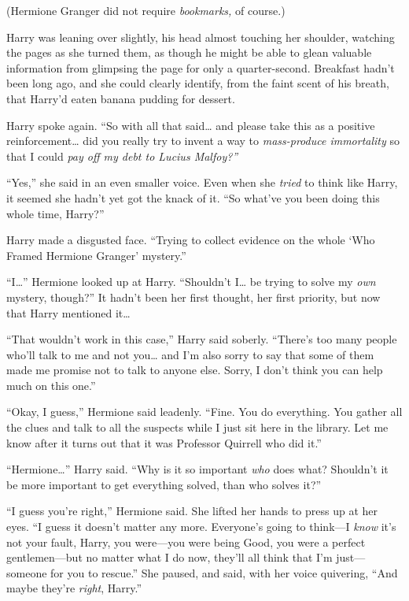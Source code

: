 (Hermione Granger did not require \emph{bookmarks,} of course.)

Harry was leaning over slightly, his head almost touching her shoulder,
watching the pages as she turned them, as though he might be able to
glean valuable information from glimpsing the page for only a
quarter-second. Breakfast hadn't been long ago, and she could clearly
identify, from the faint scent of his breath, that Harry'd eaten banana
pudding for dessert.

Harry spoke again. ``So with all that said\ldots{} and please take this
as a positive reinforcement\ldots{} did you really try to invent a way
to \emph{mass-produce immortality} so that I could \emph{pay off my debt
to Lucius Malfoy?''}

``Yes,'' she said in an even smaller voice. Even when she \emph{tried}
to think like Harry, it seemed she hadn't yet got the knack of it. ``So
what've you been doing this whole time, Harry?''

Harry made a disgusted face. ``Trying to collect evidence on the whole
`Who Framed Hermione Granger' mystery.''

``I\ldots{}'' Hermione looked up at Harry. ``Shouldn't I\ldots{} be
trying to solve my \emph{own} mystery, though?'' It hadn't been her
first thought, her first priority, but now that Harry mentioned
it\ldots{}

``That wouldn't work in this case,'' Harry said soberly. ``There's too
many people who'll talk to me and not you\ldots{} and I'm also sorry to
say that some of them made me promise not to talk to anyone else. Sorry,
I don't think you can help much on this one.''

``Okay, I guess,'' Hermione said leadenly. ``Fine. You do everything.
You gather all the clues and talk to all the suspects while I just sit
here in the library. Let me know after it turns out that it was
Professor Quirrell who did it.''

``Hermione\ldots{}'' Harry said. ``Why is it so important \emph{who}
does what? Shouldn't it be more important to get everything solved, than
who solves it?''

``I guess you're right,'' Hermione said. She lifted her hands to press
up at her eyes. ``I guess it doesn't matter any more. Everyone's going
to think---I \emph{know} it's not your fault, Harry, you were---you were
being Good, you were a perfect gentlemen---but no matter what I do now,
they'll all think that I'm just---someone for you to rescue.'' She
paused, and said, with her voice quivering, ``And maybe they're
\emph{right}, Harry.''

